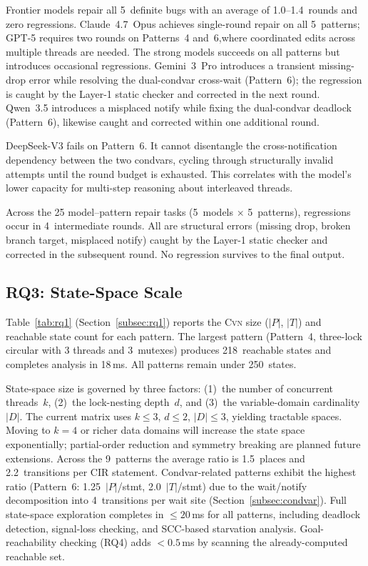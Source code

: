 \documentclass[sigconf]{acmart}
\begin{document}
Frontier models repair all 5~definite bugs with an average of 1.0--1.4~rounds and zero regressions. Claude~4.7~Opus achieves single-round repair on all 5~patterns; GPT-5 requires two rounds on Patterns~4 and~6,where coordinated edits across multiple threads are needed. The strong models succeeds on all
patterns but introduces occasional regressions. Gemini~3~Pro introduces a transient missing-\textsf{drop}
error while resolving the dual-condvar cross-wait (Pattern~6); the regression is caught by the Layer-1 static
checker and corrected in the next round. Qwen~3.5 introduces a misplaced \textsf{notify} while fixing the dual-condvar deadlock (Pattern~6), likewise caught and corrected within one additional round.

DeepSeek-V3 fails on Pattern~6. It cannot disentangle the cross-notification dependency between the two condvars, cycling through structurally invalid attempts until the round budget is exhausted. This correlates with the model's lower capacity for multi-step reasoning about interleaved threads.

Across the 25 model--pattern repair tasks (5~models $\times$ 5~patterns), regressions occur in 4~intermediate rounds. All are structural errors (missing \textsf{drop}, broken branch target, misplaced \textsf{notify}) caught by the Layer-1 static checker and corrected in the subsequent round. No regression survives to the final output.


\subsection{RQ3: State-Space Scale}
\label{subsec:rq3}

Table~\ref{tab:rq1} (Section~\ref{subsec:rq1}) reports the \textsc{Cvn} size ($|P|$, $|T|$) and reachable state count for each pattern. The largest pattern (Pattern~4, three-lock circular with 3 threads and 3~mutexes) produces 218~reachable states and completes analysis in 18\,ms. All patterns remain under 250~states.

State-space size is governed by three factors: (1)~the number of concurrent threads~$k$, (2)~the lock-nesting depth~$d$, and (3)~the variable-domain cardinality~$|D|$. The current matrix uses $k \leq 3$, $d \leq 2$,
$|D| \leq 3$, yielding tractable spaces. Moving to $k=4$ or richer data domains will increase the state space exponentially; partial-order reduction and symmetry breaking are planned future extensions. Across the 9~patterns the average ratio is 1.5~places and 2.2~transitions per CIR statement. Condvar-related patterns exhibit the highest ratio (Pattern~6: 1.25~$|P|$/stmt, 2.0~$|T|$/stmt) due to the wait/notify decomposition into 4~transitions per \textsf{wait} site (Section~\ref{subsec:condvar}). Full state-space exploration completes in $\leq 20$\,ms for all patterns, including deadlock detection, signal-loss checking, and SCC-based starvation analysis. Goal-reachability checking (RQ4) adds $< 0.5$\,ms by scanning the already-computed reachable set.
\end{document}
